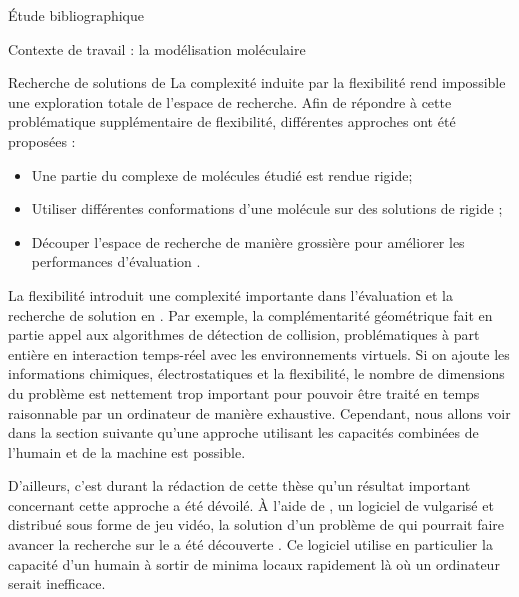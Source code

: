 \documentclass[myfrancais,ngerman,english,frenchb]{mythesis}
\begin{document}
\begin{mychapter}{Étude bibliographique}
\begin{mysection}{Contexte de travail : la modélisation moléculaire}
\begin{mysubsection}{Recherche de solutions de }
				La complexité induite par la flexibilité rend impossible une exploration totale de l'espace de recherche.
				Afin de répondre à cette problématique supplémentaire de flexibilité, différentes approches ont été proposées :
				\begin{itemize}
					\item Une partie du complexe de molécules étudié est rendue rigide;
					\item Utiliser différentes conformations d'une molécule sur des solutions de  rigide ;
					\item Découper l'espace de recherche de manière grossière pour améliorer les performances d'évaluation .
				\end{itemize}

				La flexibilité introduit une complexité importante dans l'évaluation et la recherche de solution en .
				Par exemple, la complémentarité géométrique fait en partie appel aux algorithmes de détection de collision, problématiques à part entière en interaction temps-réel avec les environnements virtuels.
				Si on ajoute les informations chimiques, électrostatiques et la flexibilité, le nombre de dimensions du problème est nettement trop important pour pouvoir être traité en temps raisonnable par un ordinateur de manière exhaustive.
				Cependant, nous allons voir dans la section suivante qu'une approche utilisant les capacités combinées de l'humain et de la machine est possible.

				D'ailleurs, c'est durant la rédaction de cette thèse qu'un résultat important concernant cette approche a été dévoilé.
				À l'aide de \myFoldIt, un logiciel de  vulgarisé et distribué sous forme de jeu vidéo, la solution d'un problème de  qui pourrait faire avancer la recherche sur le \mySIDA a été découverte .
				Ce logiciel utilise en particulier la capacité d'un humain à sortir de minima locaux rapidement là où un ordinateur serait inefficace.


\end{mysubsection}
\end{mysection}
\end{mychapter}
\end{document}
